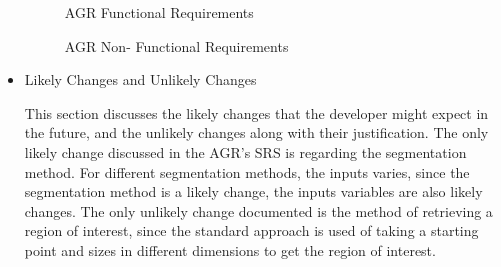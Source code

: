 \begin{itemize}
\begin{figure}[H]
    \centering
    \caption[AGR Functional Requirements]{AGR Functional Requirements}
    \label{fig_agr_fr}
\end{figure}

\begin{figure}[H]
    \centering
    \caption[AGR Non- Functional Requirements]{AGR Non- Functional Requirements}
    \label{fig_agr_nfr}
\end{figure}

\item Likely Changes and Unlikely Changes

This section discusses the likely changes that the developer might expect in the future, and the unlikely changes along with their justification. The only likely change discussed in the AGR's SRS is regarding the segmentation method. For different segmentation methods, the inputs varies, since the segmentation method is a likely change, the inputs variables are also likely changes. The only unlikely change documented is the method of retrieving a region of interest, since the standard approach is used of taking a starting point and sizes in different dimensions to get the region of interest.


\end{itemize}
